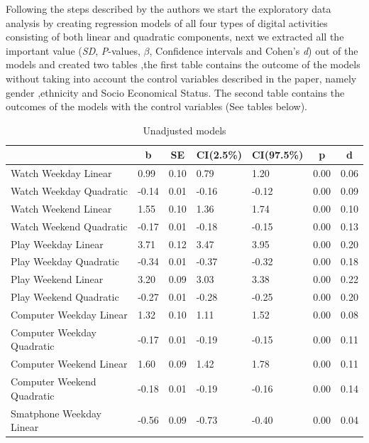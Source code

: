 \documentclass[man]{apa6}
\theoremstyle{definition}
\theoremstyle{definition}
\theoremstyle{definition}
\theoremstyle{remark}
\begin{document}
Following the steps described by the authors we start the exploratory
data analysis by creating regression models of all four types of digital
activities consisting of both linear and quadratic components, next we
extracted all the important value (\emph{SD}, \emph{P}-values,
\emph{\(\beta\)}, Confidence intervals and Cohen's \emph{d}) out of the
models and created two tables ,the first table contains the outcome of
the models without taking into account the control variables described
in the paper, namely gender ,ethnicity and Socio Economical Status. The
second table contains the outcomes of the models with the control
variables (See tables below).

\begin{table}[tbp]
\begin{center}
\begin{threeparttable}
\caption{\label{tab:unnamed-chunk-1}Unadjusted models}
\begin{tabular}{lllllll}
\toprule
 & \multicolumn{1}{c}{b} & \multicolumn{1}{c}{SE} & \multicolumn{1}{c}{CI(2.5\%)} & \multicolumn{1}{c}{CI(97.5\%)} & \multicolumn{1}{c}{p} & \multicolumn{1}{c}{d}\\
\midrule
Watch Weekday Linear & 0.99 & 0.10 & 0.79 & 1.20 & 0.00 & 0.06\\
Watch Weekday Quadratic & -0.14 & 0.01 & -0.16 & -0.12 & 0.00 & 0.09\\
Watch Weekend Linear & 1.55 & 0.10 & 1.36 & 1.74 & 0.00 & 0.10\\
Watch Weekend Quadratic & -0.17 & 0.01 & -0.18 & -0.15 & 0.00 & 0.13\\
Play Weekday Linear & 3.71 & 0.12 & 3.47 & 3.95 & 0.00 & 0.20\\
Play Weekday Quadratic & -0.34 & 0.01 & -0.37 & -0.32 & 0.00 & 0.18\\
Play Weekend Linear & 3.20 & 0.09 & 3.03 & 3.38 & 0.00 & 0.22\\
Play Weekend Quadratic & -0.27 & 0.01 & -0.28 & -0.25 & 0.00 & 0.20\\
Computer Weekday Linear & 1.32 & 0.10 & 1.11 & 1.52 & 0.00 & 0.08\\
Computer Weekday Quadratic & -0.17 & 0.01 & -0.19 & -0.15 & 0.00 & 0.11\\
Computer Weekend Linear & 1.60 & 0.09 & 1.42 & 1.78 & 0.00 & 0.11\\
Computer Weekend Quadratic & -0.18 & 0.01 & -0.19 & -0.16 & 0.00 & 0.14\\
Smatphone Weekday Linear & -0.56 & 0.09 & -0.73 & -0.40 & 0.00 & 0.04\\

\end{tabular}
\end{threeparttable}
\end{center}
\end{table}
\end{document}

